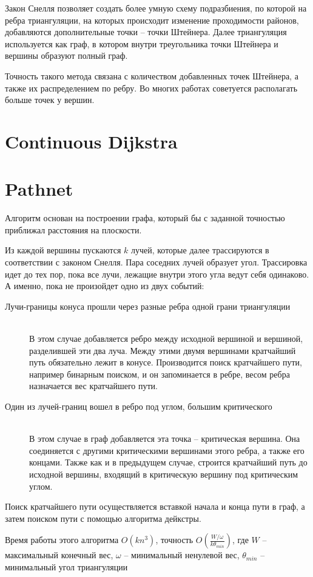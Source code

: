 Закон Снелля позволяет создать более умную схему подразбиения, по которой
на ребра триангуляции, на которых происходит изменение проходимости районов,
добавляются дополнительные точки -- точки Штейнера. Далее триангуляция
используется как граф, в котором внутри треугольника точки Штейнера и вершины
образуют полный граф.

Точность такого метода связана с количеством добавленных точек Штейнера, а
также их распределением по ребру. Во многих работах советуется располагать
больше точек у вершин.

\section{Continuous Dijkstra}


\section{Pathnet}

Алгоритм основан на построении графа, который бы с заданной точностью приближал
расстояния на плоскости.

Из каждой вершины пускаются $k$ лучей, которые далее трассируются в соответствии
с законом Снелля. Пара соседних лучей образует угол. Трассировка идет до тех пор,
пока все лучи, лежащие внутри этого угла ведут себя одинаково. А именно, пока не
произойдет одно из двух событий:
\begin{description}
\item[Лучи-границы конуса прошли через разные ребра одной грани триангуляции]\hfill \\
В этом случае добавляется ребро между исходной вершиной и вершиной, разделившей
эти два луча. Между этими двумя вершинами кратчайший путь обязательно лежит в
конусе. Производится поиск кратчайшего пути, например бинарным поиском, и он
запоминается в ребре, весом ребра назначается вес кратчайшего пути.
\item[Один из лучей-границ вошел в ребро под углом, большим критического]\hfill \\
В этом случае в граф добавляется эта точка -- критическая вершина.
Она соединяется с другими критическими вершинами этого ребра, а также его концами.
Также как и в предыдущем случае, строится кратчайший путь до исходной вершины,
входящий в критическую вершину под критическим углом.
\end{description}

Поиск кратчайшего пути осуществляется вставкой начала и конца пути в граф, а затем
поиском пути с помощью алгоритма дейкстры.

Время работы этого алгоритма $O(kn^3)$, точность $O(\frac{W/\omega}{k\theta_{min}})$,
где $W$ -- максимальный конечный вес, $\omega$ -- минимальный ненулевой вес, $\theta_{min}$ -- минимальный угол
триангуляции
